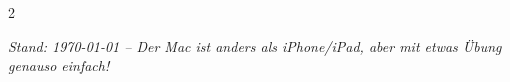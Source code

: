 \documentclass[a4paper,landscape,8pt]{extarticle}
\begin{document}
\begin{multicols}{2}
\vspace{3mm}

\begin{center}
\end{center}

\end{multicols}

\vfill

\begin{center}
\footnotesize\textit{Stand: \today{} -- Der Mac ist anders als iPhone/iPad, aber mit etwas Übung genauso einfach!}
\end{center}
\end{document}

